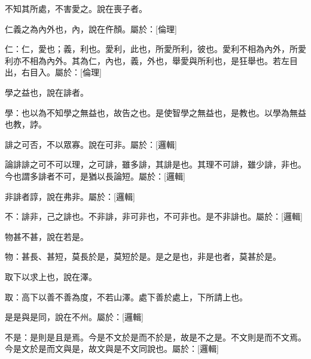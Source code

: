 \begin{pinyinscope}
不知其所處，不害愛之。說在喪子者。



仁義之為內外也，內，說在仵顏。屬於：[倫理]

仁：仁，愛也；義，利也。愛利，此也，所愛所利，彼也。愛利不相為內外，所愛利亦不相為內外。其為仁，內也，義，外也，舉愛與所利也，是狂舉也。若左目出，右目入。屬於：[倫理]

學之益也，說在誹者。

學：也以為不知學之無益也，故告之也。是使智學之無益也，是教也。以學為無益也教，誖。

誹之可否，不以眾寡。說在可非。屬於：[邏輯]

論誹誹之可不可以理，之可誹，雖多誹，其誹是也。其理不可誹，雖少誹，非也。今也謂多誹者不可，是猶以長論短。屬於：[邏輯]

非誹者諄，說在弗非。屬於：[邏輯]

不：誹非，己之誹也。不非誹，非可非也，不可非也。是不非誹也。屬於：[邏輯]

物甚不甚，說在若是。

物：甚長、甚短，莫長於是，莫短於是。是之是也，非是也者，莫甚於是。

取下以求上也，說在澤。

取：高下以善不善為度，不若山澤。處下善於處上，下所請上也。

是是與是同，說在不州。屬於：[邏輯]

不是：是則是且是焉。今是不文於是而不於是，故是不之是。不文則是而不文焉。今是文於是而文與是，故文與是不文同說也。屬於：[邏輯]


\end{pinyinscope}